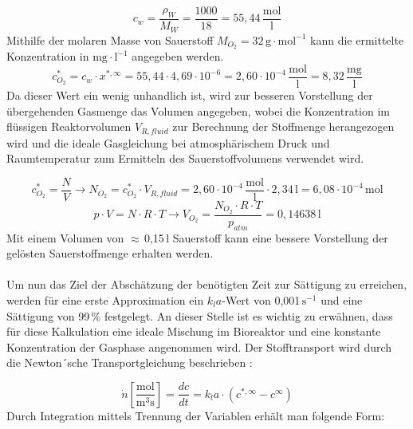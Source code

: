 \documentclass[12pt,liststotoc]{report}
\begin{document}
\begin{equation}
    c_w = \frac{\rho_{W}}{M_W} = \frac{1000}{18} = 55,44\,\frac{\text{mol}}{\text{l}}
\end{equation}
\noindent
Mithilfe der molaren Masse von Sauerstoff $M_{O_2} = 32$\,$\text{g}\cdot \text{mol}^{-1}$ kann die ermittelte Konzentration in $\text{mg}\cdot \text{l}^{-1}$ angegeben werden.
\begin{equation}
 c_{O_2}^* = c_w \cdot x^{*,\infty} = 55,44 \cdot 4,69 \cdot 10^{-6} = 2,60 \cdot 10^{-4}\,\frac{\text{mol}}{\text{l}} = 8,32\,\frac{\text{mg}}{\text{l}}
\end{equation}
\noindent
Da dieser Wert ein wenig unhandlich ist, wird zur besseren Vorstellung der übergehenden Gasmenge das Volumen angegeben, wobei die Konzentration im flüssigen Reaktorvolumen $V_{R,fluid}$ zur Berechnung der Stoffmenge herangezogen wird und die ideale Gasgleichung bei atmosphärischem Druck und Raumtemperatur zum Ermitteln des Sauerstoffvolumens verwendet wird.

\begin{equation*}
    c_{O_2}^* = \frac{N}{V} \rightarrow N_{O_2} = c_{O_2}^* \cdot V_{R,fluid} = 2,60\cdot10^{-4}\,\frac{\text{mol}}{\text{l}} \cdot 2,34\,\text{l} = 6,08\cdot10^{-4}\,\text{mol}
\end{equation*}
\begin{equation}
    p\cdot V = N\cdot R\cdot T \rightarrow V_{O_2} = \frac{N_{O_2} \cdot R \cdot T}{p_{atm}} = 0,14638\,\text{l}
\end{equation}
\noindent
Mit einem Volumen von $\approx$\,0,15\,l Sauerstoff kann eine bessere Vorstellung der gelösten Sauerstoffmenge erhalten werden.
\\
\\
Um nun das Ziel der Abschätzung der benötigten Zeit zur Sättigung zu erreichen, werden für eine erste Approximation ein $k_la$-Wert von 0,001\,$\text{s}^{-1}$ und eine Sättigung von 99\,$\%$ festgelegt. An dieser Stelle ist es wichtig zu erwähnen, dass für diese Kalkulation eine ideale Mischung im Bioreaktor und eine konstante Konzentration der Gasphase angenommen wird. Der Stofftransport wird durch die Newton´sche Transportgleichung beschrieben \cite{Labor_Skript}:

\begin{equation}
    \dot{n} \left[\frac{\text{mol}}{\text{m}^3 \text{s}}\right] = \frac{dc}{dt} = k_la \cdot (c^{*,\infty} - c^{\infty}) 
\end{equation}
\noindent
Durch Integration mittels Trennung der Variablen erhält man folgende Form:
\end{document}
